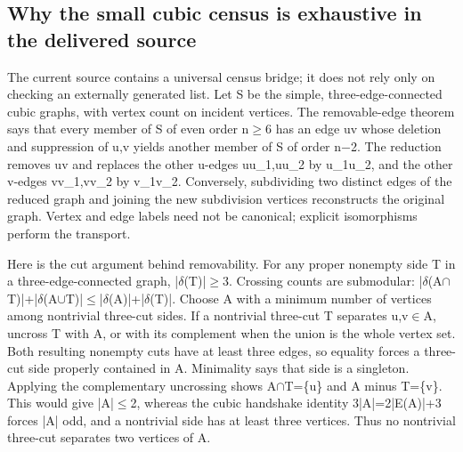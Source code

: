 \documentclass[11pt,a4paper]{article}
\begin{document}
\subsection{Why the small cubic census is exhaustive in the delivered source}
The current source contains a universal census bridge; it does not rely only on checking an externally generated list. Let S be the simple, three-edge-connected cubic graphs, with vertex count on incident vertices. The removable-edge theorem says that every member of S of even order n\ensuremath{\geq}6 has an edge uv whose deletion and suppression of u,v yields another member of S of order n\ensuremath{-}2. The reduction removes uv and replaces the other u-edges uu\_1,uu\_2 by u\_1u\_2, and the other v-edges vv\_1,vv\_2 by v\_1v\_2. Conversely, subdividing two distinct edges of the reduced graph and joining the new subdivision vertices reconstructs the original graph. Vertex and edge labels need not be canonical; explicit isomorphisms perform the transport.

Here is the cut argument behind removability. For any proper nonempty side T in a three-edge-connected graph, |\ensuremath{\delta}(T)|\ensuremath{\geq}3. Crossing counts are submodular: |\ensuremath{\delta}(A\ensuremath{\cap}T)|+|\ensuremath{\delta}(A\ensuremath{\cup}T)|\ensuremath{\leq}|\ensuremath{\delta}(A)|+|\ensuremath{\delta}(T)|. Choose A with a minimum number of vertices among nontrivial three-cut sides. If a nontrivial three-cut T separates u,v\ensuremath{\in}A, uncross T with A, or with its complement when the union is the whole vertex set. Both resulting nonempty cuts have at least three edges, so equality forces a three-cut side properly contained in A. Minimality says that side is a singleton. Applying the complementary uncrossing shows A\ensuremath{\cap}T=\{u\} and A minus T=\{v\}. This would give |A|\ensuremath{\leq}2, whereas the cubic handshake identity 3|A|=2|E(A)|+3 forces |A| odd, and a nontrivial side has at least three vertices. Thus no nontrivial three-cut separates two vertices of A.
\end{document}
